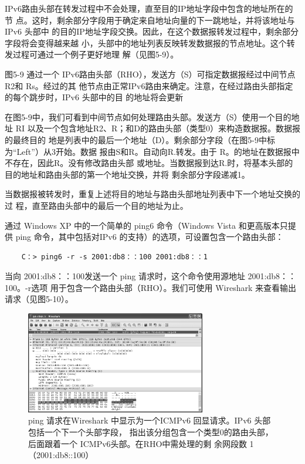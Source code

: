 IPv6路由头部在转发过程中不会处理，直至目的IP地址字段中包含的地址所在的节
点。这时，剩余部分字段用于确定来自地址向量的下一跳地址，并将该地址与IPv6 头部中
的目的IP地址字段交换。因此，在这个数据报转发过程中，剩余部分字段将会变得越来越
小，头部中的地址列表反映转发数据报的节点地址。这个转发过程可通过一个例子更好地理
解（见图5-9）。

图5-9 通过一个 IPv6路由头部（RHO），发送方（S）可指定数据报经过中间节点 R2和 Rs。经过的其
他节点由正常IPv6路由来确定。注意，在经过路由头部指定的每个跳步时，IPv6 头部中的目
的地址将会更新

在图5-9中，我们可看到中间节点如何处理路由头部。发送方（S）使用一个目的地址
RI 以及一个包含地址R2、R；和D的路由头部（类型0）来构造数据报。数据报的最终目的
地是列表中的最后一个地址（D）。剩余部分字段（在图5-9中标为“Left”）从3开始。数据
报由S和R。自动向R.转发。由于 R。的地址在数据报中不存在，因此R。没有修改路由头部
或地址。当数据报到达R.时，将基本头部的目的地址和路由头部的第一个地址交换，并将
剩余部分字段递减1。

当数据报被转发时，重复上述将目的地址与路由头部地址列表中下一个地址交换的过
程，直至路由头部中的最后一个目的地址为止。

通过 Windows XP 中的一个简单的 ping6 命令（Windows Vista 和更高版本只提供 ping
命令，其中包括对IPv6 的支持）的选项，可设置包含一个路由头部：
\begin{verbatim}
    C：> ping6 -r -s 2001:db8：：100 2001:db8：：1
\end{verbatim}

当向 2001:db8：：100发送一个 ping 请求时，这个命令使用源地址 2001:db8：：100。-r选项
用于包含一个路由头部（RHO）。我们可使用 Wireshark 来查看输出请求（见图5-10）。

\begin{figure}[!htb]
  \centering
  \includegraphics[width=0.7\textwidth]{imgs/5/5-10.png}
  \caption{ping 请求在Wireshark 中显示为一个ICMPv6 回显请求。IPv6 头部包括一个下一个头部字段，
    指出该分组包含一个类型0的路由头部，后面跟着一个 ICMPv6头部。在RHO中需处理的剩
  余网段数 1（2001:db8::100）}
\end{figure}

